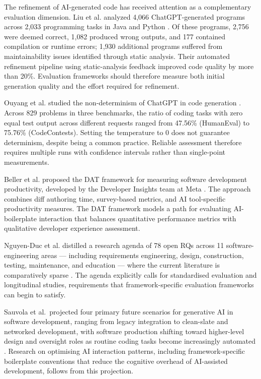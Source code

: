 \documentclass[12pt,a4paper]{report}
\begin{document}
The refinement of AI-generated code has received attention as a complementary evaluation dimension. Liu et al. analyzed 4{,}066 ChatGPT-generated programs across 2{,}033 programming tasks in Java and Python \parencite{liu2024refining}. Of these programs, 2{,}756 were deemed correct, 1{,}082 produced wrong outputs, and 177 contained compilation or runtime errors; 1{,}930 additional programs suffered from maintainability issues identified through static analysis. Their automated refinement pipeline using static-analysis feedback improved code quality by more than 20\%. Evaluation frameworks should therefore measure both initial generation quality and the effort required for refinement.

Ouyang et al. studied the non-determinism of ChatGPT in code generation \parencite{ouyang2025nondeterminism}. Across 829 problems in three benchmarks, the ratio of coding tasks with zero equal test output across different requests ranged from 47.56\% (HumanEval) to 75.76\% (CodeContests). Setting the temperature to 0 does not guarantee determinism, despite being a common practice. Reliable assessment therefore requires multiple runs with confidence intervals rather than single-point measurements.

Beller et al. proposed the DAT framework for measuring software development productivity, developed by the Developer Insights team at Meta \parencite{beller2026dat}. The approach combines diff authoring time, survey-based metrics, and AI tool-specific productivity measures. The DAT framework models a path for evaluating AI-boilerplate interaction that balances quantitative performance metrics with qualitative developer experience assessment.

Nguyen-Duc et al. distilled a research agenda of 78 open RQs across 11 software-engineering areas --- including requirements engineering, design, construction, testing, maintenance, and education --- where the current literature is comparatively sparse \parencite{nguyenduc2025genai}. The agenda explicitly calls for standardised evaluation and longitudinal studies, requirements that framework-specific evaluation frameworks can begin to satisfy.

Sauvola et al.\ projected four primary future scenarios for generative AI in software development, ranging from legacy integration to clean-slate and networked development, with software production shifting toward higher-level design and oversight roles as routine coding tasks become increasingly automated \parencite{sauvola2024future}. Research on optimising AI interaction patterns, including framework-specific boilerplate conventions that reduce the cognitive overhead of AI-assisted development, follows from this projection.
\end{document}
